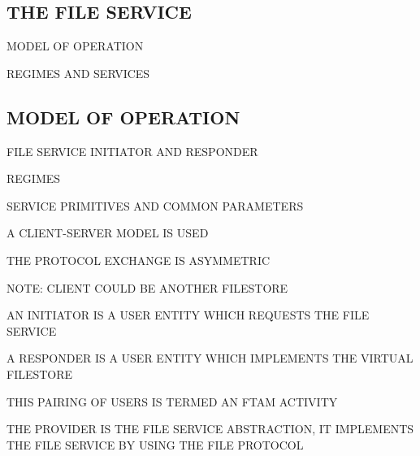 
\begin{bwslide}
\part	{THE FILE SERVICE}

\begin{nrtc}\bf
\item	MODEL OF OPERATION

\item	REGIMES AND SERVICES
\end{nrtc}
\end{bwslide}


\begin{bwslide}
\part*	{MODEL OF OPERATION}\bf

\begin{nrtc}
\item	FILE SERVICE INITIATOR AND RESPONDER

\item	REGIMES

\item	SERVICE PRIMITIVES AND COMMON PARAMETERS
\end{nrtc}
\end{bwslide}


\begin{bwslide}

\begin{nrtc}
\item	A CLIENT-SERVER MODEL IS USED
    \begin{nrtc}
    \item	THE PROTOCOL EXCHANGE IS ASYMMETRIC

    \item	NOTE: CLIENT COULD BE ANOTHER FILESTORE
    \end{nrtc}

\item	AN INITIATOR IS A USER ENTITY WHICH REQUESTS THE FILE SERVICE

\item	A RESPONDER IS A USER ENTITY WHICH IMPLEMENTS THE VIRTUAL FILESTORE

\item	THIS PAIRING OF USERS IS TERMED AN FTAM ACTIVITY

\item	THE PROVIDER IS THE FILE SERVICE ABSTRACTION,
	IT IMPLEMENTS THE FILE SERVICE BY USING THE FILE PROTOCOL
\end{nrtc}
\end{bwslide}


